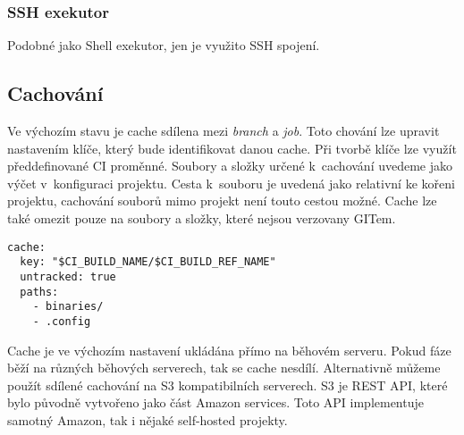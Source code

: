 \subsubsection{SSH exekutor}

Podobné jako Shell exekutor, jen je využito SSH spojení.

\subsection{Cachování}

Ve výchozím stavu je cache sdílena mezi \textit{branch} a \textit{job}.
Toto chování lze upravit nastavením klíče, který bude identifikovat danou cache.
Při tvorbě klíče lze využít předdefinované CI proměnné. 
Soubory a složky určené k~cachování uvedeme jako výčet v~konfiguraci projektu.
Cesta k~souboru je uvedená jako relativní ke kořeni projektu, cachování souborů mimo projekt není touto cestou možné. 
Cache lze také omezit pouze na soubory a složky, které nejsou verzovany GITem.

\begin{verbatim}
cache:
  key: "$CI_BUILD_NAME/$CI_BUILD_REF_NAME"
  untracked: true
  paths:
    - binaries/
    - .config
\end{verbatim}
 
Cache je ve výchozím nastavení ukládána přímo na běhovém serveru.
Pokud fáze běží na různých běhových serverech, tak se cache nesdílí.
Alternativně můžeme použít sdílené cachování na S3 kompatibilních serverech.
S3 je REST API, které bylo původně vytvořeno jako část Amazon services.
Toto API implementuje samotný Amazon, tak i nějaké self-hosted projekty.




